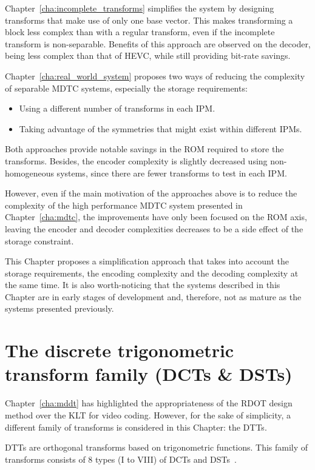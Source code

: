 \documentclass[11pt,a4paper,openright,twoside]{book}
\numberwithin{equation}{section} %
\numberwithin{figure}{section} %
\numberwithin{table}{section} %
\begin{document}
Chapter~\ref{cha:incomplete_transforms} simplifies the system by designing
transforms that make use of only one base vector.
This makes transforming a block less complex than with a regular transform,
even if the incomplete transform is non-separable.
Benefits of this approach are observed on the decoder, being less complex than
that of \ac{HEVC}, while still providing bit-rate savings.

Chapter~\ref{cha:real_world_system} proposes two ways of reducing the
complexity of separable \ac{MDTC} systems, especially the storage
requirements:
\begin{itemize}
	\item Using a different number of transforms in each \ac{IPM}.
	\item Taking advantage of the symmetries that might exist within different
		\acp{IPM}.
\end{itemize}
Both approaches provide notable savings in the \acs{ROM} required to store the
transforms.
Besides, the encoder complexity is slightly decreased using non-homogeneous
systems, since there are fewer transforms to test in each \ac{IPM}.

However, even if the main motivation of the approaches above is to reduce the
complexity of the high performance \ac{MDTC} system presented in
Chapter~\ref{cha:mdtc}, the improvements have only been focused on the
\acs{ROM} axis, leaving the encoder and decoder complexities decreases to be a
side effect of the storage constraint.

This Chapter proposes a simplification approach that takes into account the
storage requirements, the encoding complexity and the decoding complexity at
the same time.
It is also worth-noticing that the systems described in this Chapter are in
early stages of development and, therefore, not as mature as the systems
presented previously.

\section{The discrete trigonometric transform family (\acsp{DCT} \& \acsp{DST})}
\label{sec:the_dtt_family}

Chapter~\ref{cha:mddt} has highlighted the appropriateness of the \ac{RDOT}
design method over the \ac{KLT} for video coding.
However, for the sake of simplicity, a different family of transforms is
considered in this Chapter: the \acfp{DTT}.

\acsp{DTT} are orthogonal transforms based on trigonometric functions.
This family of transforms consists of 8 types (I to VIII) of \acfp{DCT} and
\acfp{DST}~\cite{rao-01-transform-data-compression-book,
puschel-08-algorithms-dct-dst}.
\end{document}
